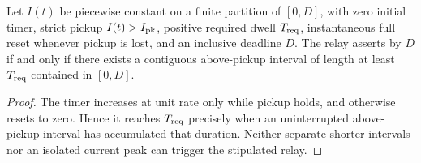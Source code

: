 \begin{proposition}\label{prop:reset}
Let \(I(t)\) be piecewise constant on a finite partition of \([0,D]\), with zero initial timer, strict pickup \(I(t)>I_{\rm pk}\), positive required dwell \(T_{\rm req}\), instantaneous full reset whenever pickup is lost, and an inclusive deadline \(D\). The relay asserts by \(D\) if and only if there exists a contiguous above-pickup interval of length at least \(T_{\rm req}\) contained in \([0,D]\).
\end{proposition}
\begin{proof}
The timer increases at unit rate only while pickup holds, and otherwise resets to zero. Hence it reaches \(T_{\rm req}\) precisely when an uninterrupted above-pickup interval has accumulated that duration. Neither separate shorter intervals nor an isolated current peak can trigger the stipulated relay.
\end{proof}
